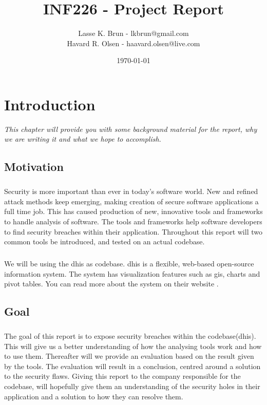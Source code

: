 \documentclass[11pt,english,a4paper]{report}
\title{INF226 - Project Report}
\date{\today}
\author{Lasse K. Brun - lkbrun@gmail.com \\ Havard R. Olsen - haavard.olsen@live.com}
\begin{document}
\maketitle

\tableofcontents
\newpage

\listoffigures
\newpage

\printglossaries
\newpage


\chapter{Introduction}
\textit{This chapter will provide you with some background material for the report, why we are writing it and what we hope to accomplish.}

\section{Motivation}
\paragraph{}
Security is more important than ever in today's software world. 
New and refined attack methods keep emerging, making creation of secure software applications a full time job. 
This has caused production of new, innovative tools and frameworks to handle analysis of software. 
The tools and frameworks help software developers to find security breaches within their application. 
Throughout this report will two common tools be introduced, and tested on an actual codebase.

\paragraph{}
We will be using the \gls{dhis} as codebase. 
\gls{dhis} is a flexible, web-based open-source information system. 
The system has visualization features such as \gls{gis}, charts and pivot tables. You can read more about the system on their website \cite{dhis2-homepage}.


\section{Goal}
\paragraph{}
The goal of this report is to expose security breaches within the codebase(\gls{dhis}). 
This will give us a better understanding of how the analysing tools work and how to use them. 
Thereafter will we provide an evaluation based on the result given by the tools. 
The evaluation will result in a conclusion, centred around a solution to the security flaws. 
Giving this report to the company responsible for the codebase, will hopefully give them an understanding of the security holes in their application and a solution to how they can resolve them.
\end{document}
